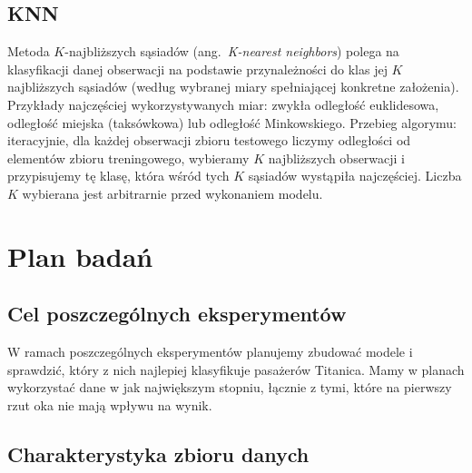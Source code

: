 \documentclass{article}
\newcommand{\ang}[1]{ang.~{\itshape #1}}
\begin{document}
\subsection{KNN}
Metoda $K$-najbliższych sąsiadów (\ang{K-nearest neighbors}) polega na klasyfikacji danej obserwacji na podstawie przynależności do klas jej $K$ najbliższych sąsiadów (według wybranej miary spełniającej konkretne założenia). Przykłady najczęściej wykorzystywanych miar: zwykła odległość euklidesowa, odległość miejska (taksówkowa) lub odległość Minkowskiego. Przebieg algorymu: iteracyjnie, dla każdej obserwacji zbioru testowego liczymy odległości od elementów zbioru treningowego, wybieramy $K$ najbliższych obserwacji i przypisujemy tę klasę, która wśród tych $K$ sąsiadów wystąpiła najczęściej. Liczba $K$ wybierana jest arbitrarnie przed wykonaniem modelu.

\section{Plan badań}

\subsection{Cel poszczególnych eksperymentów}
W ramach poszczególnych eksperymentów planujemy zbudować modele i sprawdzić, który z nich najlepiej klasyfikuje pasażerów Titanica. Mamy w planach wykorzystać dane w jak największym stopniu, łącznie z tymi, które na pierwszy rzut oka nie mają wpływu na wynik.

\subsection{Charakterystyka zbioru danych}
\end{document}
